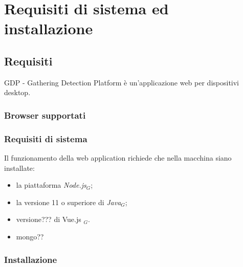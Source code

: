 \chapter{Requisiti di sistema ed installazione}\label{RequisitiDiSistemaEdInstallazione}

\section{Requisiti}\label{RequisitiDiSistemaEdInstallazioneRequisiti}
GDP - Gathering Detection Platform è un'applicazione web per dispositivi desktop.

\subsection{Browser supportati}\label{RequisitiDiSistemaEdInstallazioneRequisitiBrowserSupportati}

\subsection{Requisiti di sistema}\label{RequisitiDiSistemaEdInstallazioneRequisitiRequisitiDiSistema}

Il funzionamento della web application richiede che nella macchina siano installate:
\begin{itemize}
	\item la piattaforma \textit{Node.js}$_G$;
	\item la versione 11 o superiore di \textit{Java}$_G$;
	\item versione??? di Vue.js $_G$.
	\item mongo??
\end{itemize}

\subsection{Installazione}\label{RequisitiDiSistemaEdInstallazioneRequisitiInstallazione}